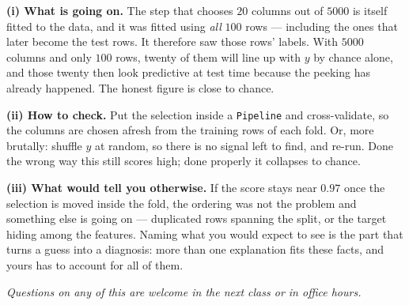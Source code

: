 \documentclass[10pt,a4paper]{article}
\begin{document}
\vspace{4pt}

\textbf{(i) What is going on.} The step that chooses $20$ columns out of $5000$ is itself fitted to the data, and it was fitted using \emph{all} $100$ rows --- including the ones that later become the test rows. It therefore saw those rows' labels. With $5000$ columns and only $100$ rows, twenty of them will line up with $y$ by chance alone, and those twenty then look predictive at test time because the peeking has already happened. The honest figure is close to chance.\par\vspace{1mm}\textbf{(ii) How to check.} Put the selection inside a \texttt{Pipeline} and cross-validate, so the columns are chosen afresh from the training rows of each fold. Or, more brutally: shuffle $y$ at random, so there is no signal left to find, and re-run. Done the wrong way this still scores high; done properly it collapses to chance.\par\vspace{1mm}\textbf{(iii) What would tell you otherwise.} If the score stays near $0.97$ once the selection is moved inside the fold, the ordering was not the problem and something else is going on --- duplicated rows spanning the split, or the target hiding among the features. Naming what you would expect to see is the part that turns a guess into a diagnosis: more than one explanation fits these facts, and yours has to account for all of them.

\vfill

{\footnotesize\itshape Questions on any of this are welcome in the next class or in office hours.}

\newpage
\end{document}

